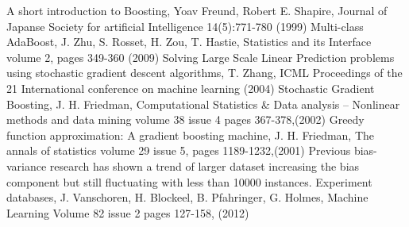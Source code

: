 \documentclass[a4paper,10pt]{article}
\begin{document}
\begin{thebibliography}{9}
 A short introduction to Boosting, Yoav Freund, Robert E. Shapire, Journal of Japanse Society for artificial Intelligence 14(5):771-780 (1999)
 Multi-class AdaBoost, J. Zhu, S. Rosset, H. Zou, T. Hastie, Statistics and its Interface volume 2, pages 349-360 (2009)
 Solving Large Scale Linear Prediction problems using stochastic gradient descent algorithms, T. Zhang, ICML Proceedings of the 21 International conference on machine learning (2004)
 Stochastic Gradient Boosting, J. H. Friedman,  Computational Statistics \& Data analysis – Nonlinear methods and data mining volume 38 issue 4 pages 367-378,(2002)
 Greedy function approximation: A gradient boosting machine, J. H. Friedman, The annals of statistics volume 29 issue 5, pages 1189-1232,(2001)
Previous bias-variance research has shown a trend of larger dataset increasing the bias component but still fluctuating with  less than 10000 instances.
 Experiment databases, J. Vanschoren, H. Blockeel, B. Pfahringer, G. Holmes, Machine Learning Volume 82 issue 2 pages 127-158, (2012)

 
     
\end{thebibliography}
\endgroup
\end{document}
